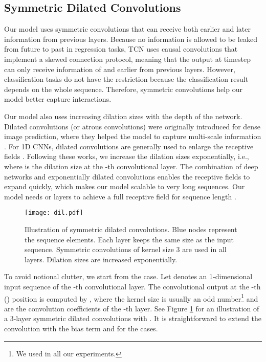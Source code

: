 \documentclass{article}
\begin{document}
\subsection{Symmetric Dilated Convolutions}
\label{subsec:conv}

Our model uses symmetric convolutions that can receive both earlier and later information from previous layers. Because no information is allowed to be leaked from future to past in regression tasks, TCN uses causal convolutions that implement a skewed connection protocol, meaning that the output at timestep  can only receive information of  and earlier from previous layers. However, classification tasks do not have the restriction because the classification result depends on the whole sequence. Therefore, symmetric convolutions help our model better capture interactions.

Our model also uses increasing dilation sizes with the depth of the network. Dilated convolutions (or atrous convolutions) were originally introduced for dense image prediction, where they helped the model to capture multi-scale information \cite{yu2015multi, chen2017deeplab, chen2017rethinking, chen2018searching, wang2018understanding}. For 1D CNNs, dilated convolutions are generally used to enlarge the receptive fields \cite{oord2016wavenet, kalchbrenner2016neural, lea2017temporal, bai2018empirical}. Following these works, we increase the dilation sizes exponentially, i.e.,  where  is the dilation size at the -th convolutional layer. The combination of deep networks and exponentially dilated convolutions enables the receptive fields to expand quickly, which makes our model scalable to very long sequences. Our model needs  or  layers to achieve a full receptive field for sequence length .

\begin{figure}[tb]
	\centering
	\texttt{[image: dil.pdf]}
	\caption{Illustration of symmetric dilated convolutions. Blue nodes represent the sequence elements. Each layer keeps the same size as the input sequence. Symmetric convolutions of kernel size 3 are used in all layers. Dilation sizes are increased exponentially.}
	\label{fig:dil}
\end{figure}

To avoid notional clutter, we start from the  case. Let  denotes an 1-dimensional input sequence of the -th convolutional layer. The convolutional output  at the -th () position is computed by
,
where the kernel size  is usually an odd number\footnote{We used  in all our experiments.} and  are the convolution coefficients of the -th layer. See Figure \ref{fig:dil} for an illustration of a 3-layer symmetric dilated convolutions with . It is straightforward to extend the convolution with the bias term and for the  cases.
\end{document}
